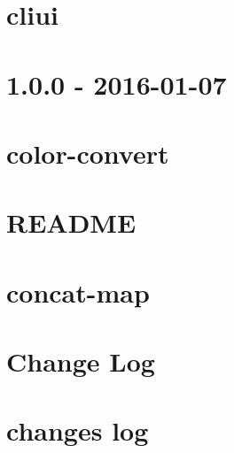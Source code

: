 \let\mypdfximage\pdfximage\def\pdfximage{\immediate\mypdfximage}\documentclass[twoside]{book}
\newcommand{\+}{\discretionary{\mbox{\scriptsize$\hookleftarrow$}}{}{}}
\begin{document}
\chapter{cliui}
\label{md_heap-visualizer_node_modules_cliui__r_e_a_d_m_e}

\chapter{1.0.0 -\/ 2016-\/01-\/07}
\label{md_heap-visualizer_node_modules_color-convert__c_h_a_n_g_e_l_o_g}

\chapter{color-\/convert}
\label{md_heap-visualizer_node_modules_color-convert__r_e_a_d_m_e}

\chapter{R\+E\+A\+D\+ME}
\label{md_heap-visualizer_node_modules_color-name__r_e_a_d_m_e}

\chapter{concat-\/map}
\label{md_heap-visualizer_node_modules_concat-map__r_e_a_d_m_e}

\chapter{Change Log}
\label{md_heap-visualizer_node_modules_cross-spawn__c_h_a_n_g_e_l_o_g}

\chapter{changes log}
\label{md_heap-visualizer_node_modules_cross-spawn_node_modules_semver__c_h_a_n_g_e_l_o_g}

\end{document}
